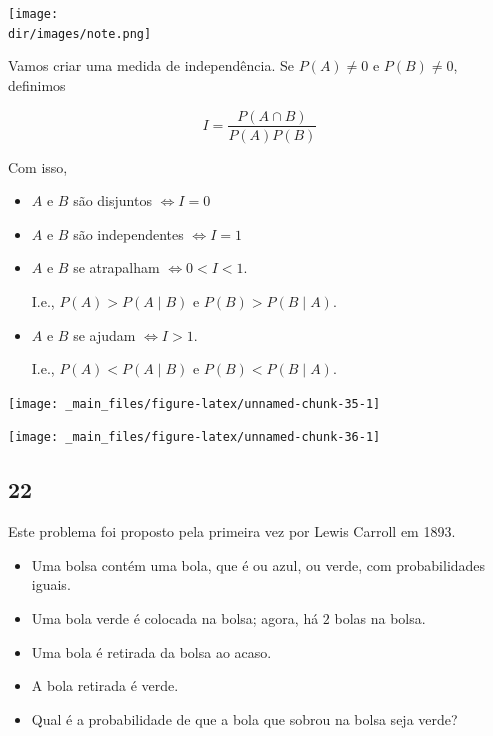 \documentclass[
  11pt]{report}
\newcommand{\dir}{/ssd/R/x86_64-pc-linux-gnu-library/4.1/fnaufelRmd/rmarkdown/resources}
\newenvironment{rmdnote}
{
  \begin{mynote}
    \texttt{[image: \\dir/images/note.png]}
    \tcblower
  }
  {
  \end{mynote}
}
\begin{document}
\begin{rmdnote}

Vamos criar uma medida de independência. Se $P(A) \neq 0$ e $P(B) \neq 0$, definimos

\[
I = \frac{P(A \cap B)}{P(A)P(B)}
\]

Com isso,

\begin{itemize}
\item
  $A$ e $B$ são disjuntos ${} \iff I = 0$
\item
  $A$ e $B$ são independentes ${} \iff I = 1$
\item
  $A$ e $B$ se atrapalham ${} \iff 0 < I < 1$.

  I.e., $P(A) > P(A \mid B)$ e $P(B) > P(B \mid A)$.
\item
  $A$ e $B$ se ajudam ${} \iff I > 1$.

  I.e., $P(A) < P(A \mid B)$ e $P(B) < P(B \mid A)$.
\end{itemize}

\end{rmdnote}

\begin{center}\texttt{[image: \_main\_files/figure-latex/unnamed-chunk-35-1]} \end{center}

\begin{center}\texttt{[image: \_main\_files/figure-latex/unnamed-chunk-36-1]} \end{center}

\hypertarget{section-15}{%
\subsection*{22}\label{section-15}}

\begin{rmdbox}

Este problema foi proposto pela primeira vez por Lewis Carroll em 1893.

\begin{itemize}
\item
  Uma bolsa contém uma bola, que é ou azul, ou verde, com probabilidades iguais.
\item
  Uma bola verde é colocada na bolsa; agora, há $2$ bolas na bolsa.
\item
  Uma bola é retirada da bolsa ao acaso.
\item
  A bola retirada é verde.
\item
  Qual é a probabilidade de que a bola que sobrou na bolsa seja verde?
\end{itemize}

\end{rmdbox}
\end{document}
